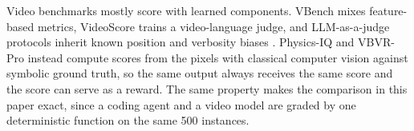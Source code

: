 Video benchmarks mostly score with learned components. VBench \citep{huang2024vbench} mixes feature-based metrics, VideoScore \citep{he2024videoscore} trains a video-language judge, and LLM-as-a-judge protocols inherit known position and verbosity biases \citep{zheng2023judging}. Physics-IQ \citep{motamed2025physicsiq} and VBVR-Pro instead compute scores from the pixels with classical computer vision against symbolic ground truth, so the same output always receives the same score and the score can serve as a reward. The same property makes the comparison in this paper exact, since a coding agent and a video model are graded by one deterministic function on the same 500 instances.
